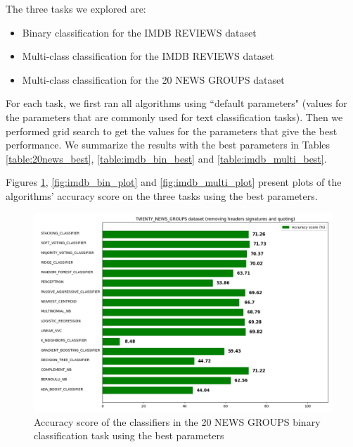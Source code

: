 \documentclass[conference]{IEEEtran}
\begin{document}
The three tasks we explored are:

\begin{itemize}
    \item Binary classification for the IMDB REVIEWS dataset 
    \item Multi-class classification for the IMDB REVIEWS dataset
    \item Multi-class classification for the 20 NEWS GROUPS dataset
\end{itemize}

For each task, we first ran all algorithms using ``default parameters" (values for the parameters that are commonly used for text classification tasks). Then we performed grid search to get the values for the parameters that give the best performance. We summarize the results with the best parameters in Tables \ref{table:20news_best}, \ref{table:imdb_bin_best} and \ref{table:imdb_multi_best}.

Figures \ref{fig:20news_plot}, \ref{fig:imdb_bin_plot} and \ref{fig:imdb_multi_plot} present plots of the algorithms' accuracy score on the three tasks using the best parameters.

\begin{figure}[H]
\centering
\includegraphics[scale = 0.21]{figs/all_classifiers_20newsgroups_and_imdb_using_binary_classification/TWENTY_NEWS_GROUPS-just_accuracy_score.png}
\caption{Accuracy score of the classifiers in the 20 NEWS GROUPS binary classification task using the best parameters}
\label{fig:20news_plot}
\end{figure}
\end{document}
